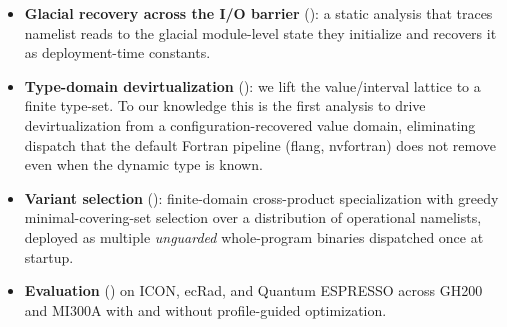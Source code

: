 \begin{itemize}
  \item \textbf{Glacial recovery across the I/O barrier} (): a static analysis that traces namelist reads to the glacial module-level state they initialize and recovers it as deployment-time constants.
  \item \textbf{Type-domain devirtualization} (): we lift the value/interval lattice to a finite type-set. To our knowledge this is the first analysis to drive devirtualization from a configuration-recovered value domain, eliminating dispatch that the default Fortran pipeline (flang, nvfortran) does not remove even when the dynamic type is known. 
  \item \textbf{Variant selection} (): finite-domain cross-product specialization with greedy minimal-covering-set selection over a distribution of operational namelists, deployed as multiple \emph{unguarded} whole-program binaries dispatched once at startup.
  \item \textbf{Evaluation} () on ICON, ecRad, and Quantum ESPRESSO across GH200 and MI300A with and without profile-guided optimization. 
\end{itemize}
